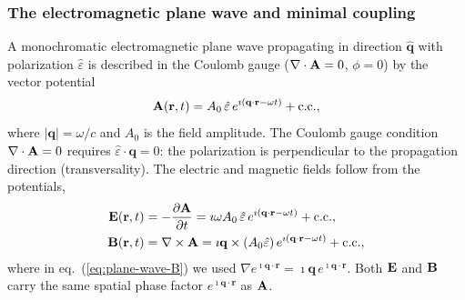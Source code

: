 \subsubsection{The electromagnetic plane wave and minimal coupling}
\label{sec:plane-wave}

A monochromatic electromagnetic plane wave propagating in direction
$\hat{\mathbf{q}}$ with polarization $\hat{\varepsilon}$ is described
in the Coulomb gauge ($\nabla\cdot\mathbf{A}=0$, $\phi=0$) by the
vector potential
\begin{equation}
  \mathbf{A}(\mathbf{r},t)
  = A_0\,\hat{\varepsilon}\,
    e^{\imath(\mathbf{q}\cdot\mathbf{r}-\omega t)}
    + \text{c.c.},
  \label{eq:plane-wave-A}
\end{equation}
where $|\mathbf{q}|=\omega/c$ and $A_0$ is the field amplitude.
The Coulomb gauge condition $\nabla\cdot\mathbf{A}=0$ requires
$\hat{\varepsilon}\cdot\mathbf{q}=0$: the polarization is
perpendicular to the propagation direction (transversality).
The electric and magnetic fields follow from the potentials,
\begin{align}
  \mathbf{E}(\mathbf{r},t)
  &= -\frac{\partial\mathbf{A}}{\partial t}
   = \imath\omega A_0\,\hat{\varepsilon}\,
     e^{\imath(\mathbf{q}\cdot\mathbf{r}-\omega t)}
     + \text{c.c.},
  \label{eq:plane-wave-E}
  \\
  \mathbf{B}(\mathbf{r},t)
  &= \nabla\times\mathbf{A}
   = \imath\mathbf{q}\times(A_0\hat{\varepsilon})\,
     e^{\imath(\mathbf{q}\cdot\mathbf{r}-\omega t)}
     + \text{c.c.},
  \label{eq:plane-wave-B}
\end{align}
where in eq.~(\ref{eq:plane-wave-B}) we used
$\nabla e^{\imath\mathbf{q}\cdot\mathbf{r}}
=\imath\mathbf{q}\,e^{\imath\mathbf{q}\cdot\mathbf{r}}$.
Both $\mathbf{E}$ and $\mathbf{B}$ carry the same spatial phase factor
$e^{\imath\mathbf{q}\cdot\mathbf{r}}$ as $\mathbf{A}$.

